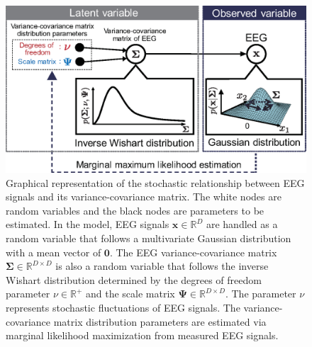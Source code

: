 \documentclass[journal]{IEEEtran}
\begin{document}
\begin{figure}[!t]
\centering
\includegraphics[width=1.0\hsize]{figure/fig1_ver2.eps}
\caption{Graphical representation of the stochastic relationship between EEG signals  and its variance-covariance matrix.
The white nodes are random variables and the black nodes are parameters to be estimated.
In the model, EEG signals $\mathbf{x} \in \mathbb{R}^{D}$ are handled as a random variable that follows a multivariate Gaussian distribution with a mean vector of $\mathbf{0}$.
The EEG variance-covariance matrix $\mathbf{\Sigma} \in \mathbb{R}^{D \times D}$ is also a random variable that follows the inverse Wishart distribution determined by the degrees of freedom parameter $\nu \in \mathbb{R}^+$ and the scale matrix $\mathbf{\Psi} \in \mathbb{R}^{D \times D}$. The parameter $\nu$ represents stochastic fluctuations of EEG signals.
The variance-covariance matrix distribution parameters are estimated via marginal likelihood maximization from measured EEG signals.}
\label{fig:model}
\end{figure}
\end{document}
